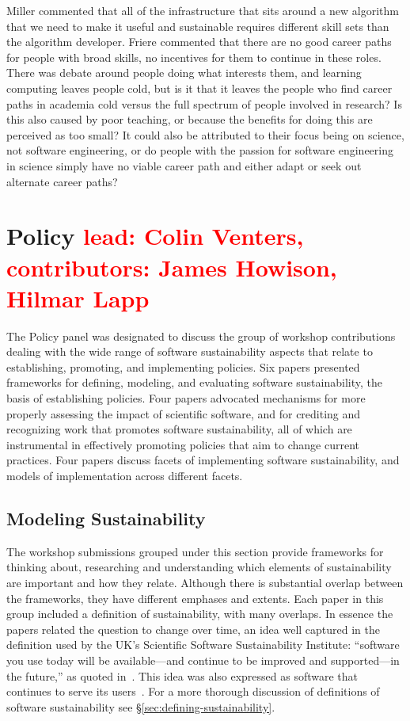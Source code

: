\documentclass[11pt, oneside]{amsart}
\newcommand{\note}[1]{ {\textcolor{red}    { #1 }}}
\begin{document}
Miller commented that all of the infrastructure that sits around a new
algorithm that we need to make it useful and sustainable requires different
skill sets than the algorithm developer. Friere commented that there are no
good career paths for people with broad skills, no incentives for them to
continue in these roles. There was debate around people doing what interests
them, and learning computing leaves people cold, but is it that it leaves the
people who find career paths in academia cold versus the full spectrum of
people involved in research? Is this also caused by poor teaching, or because the
benefits for doing this are perceived as too small? It could also be attributed to
their focus being on science, not software engineering, or do people with
the passion for software engineering in science simply have no viable career
path and either adapt or seek out alternate career paths?

\section{Policy \note{lead: Colin Venters, contributors: James Howison, Hilmar Lapp}} \label{sec:policy}

The Policy panel was designated to discuss the group of workshop
contributions dealing with the wide range of software sustainability
aspects that relate to establishing, promoting, and implementing
policies. Six papers presented frameworks for defining, modeling, and
evaluating software sustainability, the basis of establishing
policies. Four papers advocated mechanisms for more properly assessing
the impact of scientific software, and for crediting and recognizing
work that promotes software sustainability, all of which are
instrumental in effectively promoting policies that aim to change
current practices. Four papers discuss facets of implementing software
sustainability, and models of implementation across different facets.
 
\subsection{Modeling Sustainability}

The workshop submissions grouped under this section provide frameworks
for thinking about, researching and understanding which elements of sustainability
are important and how they relate. Although there is substantial
overlap between the frameworks, they have different emphases and
extents.  Each paper in this group included a definition of sustainability,
with many overlaps.  In essence the papers related the question to
change over time, an idea well captured in the definition used by the
UK's Scientific Software Sustainability Institute: ``software you use
today will be available---and continue to be improved and
supported---in the future,'' as quoted in~\cite{Venters_WSSSPE}. This
idea was also expressed as software that continues to serve its
users~\cite{Pierce_WSSSPE}.  For a more thorough discussion of definitions
of software sustainability see \S\ref{sec:defining-sustainability}.
\end{document}
